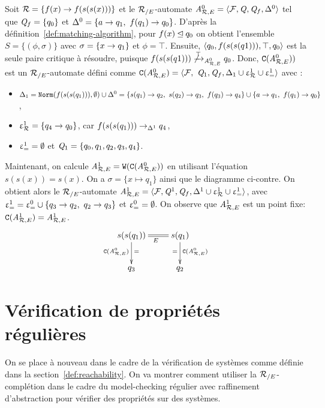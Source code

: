 \begin{example}
  \label{ex:W}
  Soit $\mathcal R = \{f(x) \rightarrow f(s(s(x)))\}$ et le ${\mathcal R_{/E}}$-automate
  ${\mathit A}_{\mathcal R,E}^0 = \langle\mathcal{F},\mathit Q,\mathit Q_f,\Delta^0\rangle$ tel que $\mathit Q_f = \{q_0\}$
  et $\Delta^0 = \{a \rightarrow q_1,\ f(q_1) \rightarrow q_0\}$.
  D'après la définition~\ref{def:matching-algorithm}, pour $f(x) \unlhd q_0$ on obtient l'ensemble $S = \{(\phi,\sigma)\}$
  avec $\sigma = \{x \rightarrow q_1\}$ et $\phi = \top$. Ensuite,
  $\langle q_0, f(s(s(q1))), \top, q_0\rangle$ est la seule paire critique à résoudre, puisque 
  $f(s(s(q1))) \not\xrightarrow{\top}_{{\mathit A}_{\mathcal R,E}^0} q_0$. Donc, $\mathtt{C}({\mathit A}_{\mathcal R,E}^0))$ est un ${\mathcal R_{/E}}$-automate défini comme
  $\mathtt{C}({\mathit A}_{\mathcal R,E}^0) = \langle\mathcal{F},\ \mathit Q_1, \mathit Q_f, \Delta_1 \cup \upvarepsilon_{\mathcal R}^1 \cup \upvarepsilon_{=}^1 \rangle$ avec :
  \begin{itemize}
  \item  $\Delta_1 = \mathtt{Norm}(f(s(s(q_1))),\emptyset) \cup \Delta^0 =
    \{s(q_1) \rightarrow q_2,\ s(q_2) \rightarrow q_3,\ f(q_3) \rightarrow q_4\} \cup \{a \rightarrow q_1,\ f(q_1) \rightarrow q_0\}$,
  \item
    $\upvarepsilon_{\mathcal R}^1 = \{q_4 \rightarrow q_0\}$, car $f(s(s(q_1))) \rightarrow_{\Delta^1} q_4$,
  \item $\upvarepsilon_{=}^1 = \emptyset$ et $\mathit Q_1 = \{q_0,q_1,q_2,q_3,q_4\}$.
  \end{itemize}

  Maintenant, on calcule ${\mathit A}_{\mathcal R,E}^1 = \mathtt{W}(\mathtt{C}({\mathit A}_{\mathcal R,E}^0))$ en utilisant l'équation
  $s(s(x))=s(x)$.  On a $\sigma=\{x \mapsto q_1\}$ ainsi que le diagramme ci-contre.
  On obtient alors le ${\mathcal R_{/E}}$-automate ${\mathit A}_{\mathcal R,E}^1 = \langle \mathcal{F}, \mathit Q^1, \mathit Q_f, \Delta^1 \cup \upvarepsilon_{\mathcal R}^1 \cup \upvarepsilon_{=}^1\rangle$,
  avec $\upvarepsilon_{=}^1= \upvarepsilon_{=}^0 \cup \{q_3 \rightarrow q_2,\ q_2 \rightarrow q_3\}$ et $\upvarepsilon_{=}^0=\emptyset$.  On observe que ${\mathit A}_{\mathcal R,E}^1$
  est un point fixe: $\mathtt{C}({\mathit A}_{\mathcal R,E}^1) = {\mathit A}_{\mathcal R,E}^1$.
  \[\xymatrix{
    s(s(q_1)) \ar@{=}[r]_{E}\ar[d]^{=}_{\compl(\aaexeq^0)} & s(q_1) \ar[d]^{\compl(\aaexeq^0)}_{=}\\
    q_3 & q_2
  }\]
\end{example}


\section{Vérification de propriétés régulières}
On se place à nouveau dans le cadre de la vérification de systèmes comme définie dans la section~\ref{def:reachability}.
On va montrer comment utiliser la ${\mathcal R_{/E}}$-complétion  dans le cadre du model-checking régulier 
avec raffinement d'abstraction pour vérifier des propriétés sur des systèmes.

